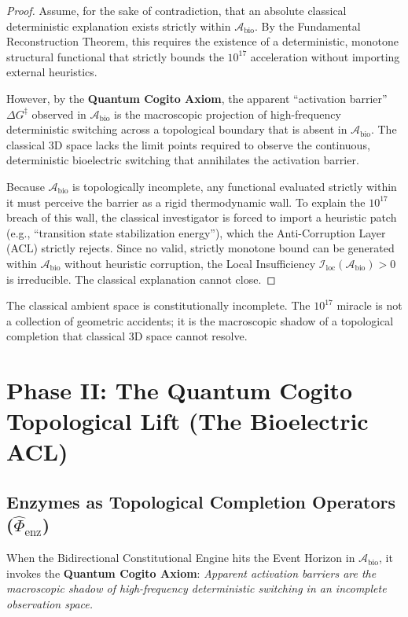 \documentclass[11pt,openany]{extbook}
\theoremstyle{plain}
\theoremstyle{definition}
\begin{document}
\begin{proof}
Assume, for the sake of contradiction, that an absolute classical deterministic explanation exists strictly within $\mathcal{A}_{\text{bio}}$. By the Fundamental Reconstruction Theorem, this requires the existence of a deterministic, monotone structural functional that strictly bounds the $10^{17}$ acceleration without importing external heuristics.

However, by the \textbf{Quantum Cogito Axiom}, the apparent ``activation barrier'' $\Delta G^{\ddagger}$ observed in $\mathcal{A}_{\text{bio}}$ is the macroscopic projection of high-frequency deterministic switching across a topological boundary that is absent in $\mathcal{A}_{\text{bio}}$. The classical 3D space lacks the limit points required to observe the continuous, deterministic bioelectric switching that annihilates the activation barrier.

Because $\mathcal{A}_{\text{bio}}$ is topologically incomplete, any functional evaluated strictly within it must perceive the barrier as a rigid thermodynamic wall. To explain the $10^{17}$ breach of this wall, the classical investigator is forced to import a heuristic patch (e.g., ``transition state stabilization energy''), which the Anti-Corruption Layer (ACL) strictly rejects. Since no valid, strictly monotone bound can be generated within $\mathcal{A}_{\text{bio}}$ without heuristic corruption, the Local Insufficiency $\mathcal{I}_{\text{loc}}(\mathcal{A}_{\text{bio}}) > 0$ is irreducible. The classical explanation cannot close.
\end{proof}

The classical ambient space is constitutionally incomplete. The $10^{17}$ miracle is not a collection of geometric accidents; it is the macroscopic shadow of a topological completion that classical 3D space cannot resolve.

\section{Phase II: The Quantum Cogito Topological Lift (The Bioelectric ACL)}

\subsection{Enzymes as Topological Completion Operators ($\hat{\Phi}_{\text{enz}}$)}
When the Bidirectional Constitutional Engine hits the Event Horizon in $\mathcal{A}_{\text{bio}}$, it invokes the \textbf{Quantum Cogito Axiom}: \textit{Apparent activation barriers are the macroscopic shadow of high-frequency deterministic switching in an incomplete observation space.}
\end{document}
